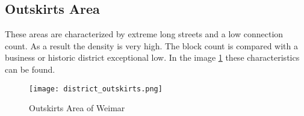 \FloatBarrier
\subsection{Outskirts Area}
\label{sec:outskits}
These areas are characterized by extreme long streets and a low connection count. As a result the density is very high. The block count is compared with a business or historic district exceptional low. In the image \ref{fig:outskirts_district} these characteristics can be found.

\begin{figure}[!ht]
    \centering
    \begin{mdframed}[style=mdthight, userdefinedwidth=0.4\textwidth, align=center]
        \texttt{[image: district\_outskirts.png]}
    \end{mdframed}
    \caption{Outskirts Area of Weimar}
    \label{fig:outskirts_district}
\end{figure}